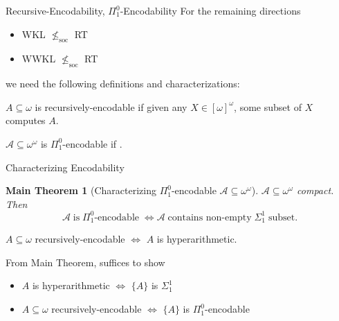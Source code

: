 \begin{frame}{Recursive-Encodability, $\Pi_1^0$-Encodability}
  For the remaining directions
  \begin{itemize}
    \item WKL $\nleq_{\text{soc}}$ RT
    \item WWKL $\nleq_{\text{soc}}$ RT
  \end{itemize}

  we need the following definitions and characterizations:
  \vspace{1em}

  \begin{define}
    $A\subseteq\omega$ is recursively-encodable if given any
    $X\in[\omega]^\omega$, some subset of $X$ computes $A$.
  \end{define}

  \begin{define}[$\Pi_1^0$-encodability]
    $\mathcal{A}\subseteq \omega^{\omega}$ is $\Pi_1^0$-encodable if
    .
  \end{define}
\end{frame}

\begin{frame}{Characterizing Encodability}
  \newtheorem*{main-thm*}{Main Theorem}
  \begin{main-thm*}[Characterizing $\Pi_1^0$-encodable
  $\mathcal{A}\subseteq\omega^\omega$]
    $\mathcal{A}\subseteq \omega^{\omega}$ compact. Then
    \[\mathcal{A}\; \text{is}\; \Pi_1^0\text{-encodable}\; \Leftrightarrow
    \mathcal{A}\; \text{contains non-empty}\; \Sigma_1^1\; \text{subset}.\]
  \end{main-thm*}

  \begin{coro*}
    $A\subseteq\omega$ recursively-encodable $\Leftrightarrow$ $A$ is
    hyperarithmetic.
  \end{coro*}

  \vspace{1em}
  From Main Theorem, suffices to show
  \begin{itemize}
    \item $A$ is hyperarithmetic $\Leftrightarrow$ $\{A\}$ is $\Sigma_1^1$
    \item $A\subseteq\omega$ recursively-encodable $\Leftrightarrow$
      $\{A\}$ is $\Pi_1^0$-encodable
  \end{itemize}
\end{frame}

